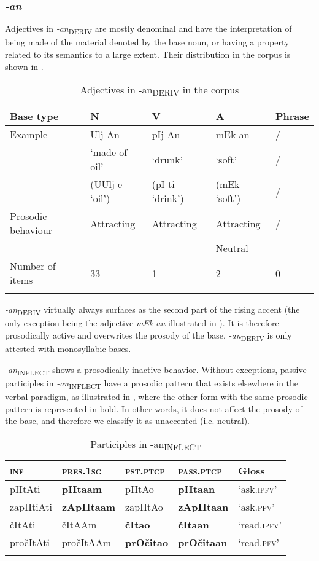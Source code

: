\documentclass[output=paper]{langsci/langscibook}
\begin{document}
\subsubsection{\textit{-an}}\label{sec:simonovic:421}
Adjectives in \textit{-an}\textsubscript{DERIV} are mostly denominal and have the interpretation of being made of the material denoted by the base noun, or having a property related to its semantics to a large extent. Their distribution in the corpus is shown in .

\begin{table}
\caption{Adjectives in {-an}\textsubscript{DERIV} in the corpus}
\label{tab5}
\begin{tabular}{l l l l l}
\lsptoprule  
 Base type & N & V & A & Phrase
\\ %
\midrule
Example  &  Ulj-An & pIj-An & mEk-an  & /   \\
   & `made of oil' & `drunk' & `soft' & /  \\
& (UUlj-e `oil') & (pI-ti `drink') & (mEk `soft') & /	\smallskip\\ 
Prosodic behaviour & Attracting & Attracting & 
Attracting & / \\ 
& & & Neutral \smallskip& \\
Number of items & 33 & 1 & 2 & 0 \\
 \lspbottomrule
 \end{tabular}
\end{table}

\textit{-an}\textsubscript{DERIV} virtually always surfaces as the second part of the rising accent (the only exception being the adjective \textit{mEk-an} illustrated in ). It is therefore prosodically active and overwrites the prosody of the base. \textit{-an}\textsubscript{DERIV} is only attested with monosyllabic bases.

\textit{-an}\textsubscript{INFLECT} shows a prosodically inactive behavior. Without exceptions, passive participles in \textit{-an}\textsubscript{INFLECT} have a prosodic pattern that exists elsewhere in the verbal paradigm, as illustrated in , where the other form with the same prosodic pattern is represented in bold. In other words, it does not affect the prosody of the base, and therefore we classify it as unaccented (i.e. neutral).

\begin{table}
\caption{Participles in {-an}\textsubscript{INFLECT}}
\label{tab6}
 \begin{tabular}{ l l l l l}
\lsptoprule  
\textsc{inf}&\textsc{pres.1sg}&\textsc{pst.ptcp}&\textsc{pass.ptcp}& Gloss
\\ 
\midrule
pIItAti&\textbf{pIItaam}&pIItAo&\textbf{pIItaan}&	`ask.\textsc{ipfv}' \\
zapIItiAti&\textbf{zApIItaam}&zapIItAo&\textbf{zApIItaan}&`ask.\textsc{pfv}'\\
čItAti&čItAAm&\textbf{čItao}&\textbf{čItaan}&`read.\textsc{ipfv}'\\
pročItAti&pročItAAm&\textbf{prOčitao}&\textbf{prOčitaan}&`read.\textsc{pfv}'
\\
 \lspbottomrule
 \end{tabular}
\end{table}
\end{document}
